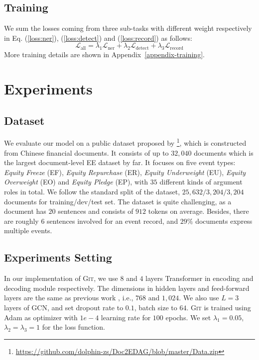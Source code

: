 \documentclass[11pt,a4paper]{article}
\newcommand{\modelname}{\textsc{Git}\xspace}
\begin{document}
\subsection{Training}
We sum the losses coming from three sub-tasks with different weight respectively in Eq. (\ref{loss:ner}), (\ref{loss:detect}) and (\ref{loss:record}) as follows:
\begin{equation*}
    \mathcal{L}_{\mathrm{all}} = \lambda_1 \mathcal{L}_{\mathrm{ner}} + \lambda_2 \mathcal{L}_{\mathrm{detect}} + \lambda_3 \mathcal{L}_{\mathrm{record}}
\end{equation*}
More training details are shown in Appendix~\ref{appendix-training}. \section{Experiments}

\subsection{Dataset}
We evaluate our model on a public dataset proposed by \citet{zheng-etal-2019-doc2edag}\footnote{\url{https://github.com/dolphin-zs/Doc2EDAG/blob/master/Data.zip}}, which is constructed from Chinese financial documents.
It consists of up to $32,040$ documents which is the largest document-level EE dataset by far.
It focuses on five event types: \textit{Equity Freeze} (EF), \textit{Equity Repurchase} (ER), \textit{Equity Underweight} (EU), \textit{Equity Overweight} (EO) and \textit{Equity Pledge} (EP), with $35$ different kinds of argument roles in total.
We follow the standard split of the dataset, $25,632/3,204/3,204$ documents for training/dev/test set. 
The dataset is quite challenging, as a document has $20$ sentences and consists of $912$ tokens on average.
Besides, there are roughly $6$ sentences involved for an event record, and $29\%$ documents express multiple events.


\subsection{Experiments Setting}
In our implementation of \modelname, we use $8$ and $4$ layers Transformer \citep{NIPS2017_7181} in encoding and decoding module respectively. 
The dimensions in hidden layers and feed-forward layers are the same as previous work \citep{zheng-etal-2019-doc2edag}, i.e.,  $768$ and $1,024$.
We also use $L=3$ layers of GCN, and set dropout rate to $0.1$, batch size to $64$.
\modelname is trained using Adam \citep{DBLP:journals/corr/KingmaB14} as optimizer with $1e-4$ learning rate for $100$ epochs.
We set $\lambda_1=0.05$, $\lambda_2=\lambda_3=1$ for the loss function.
\end{document}
